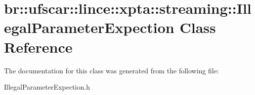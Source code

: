\hypertarget{classbr_1_1ufscar_1_1lince_1_1xpta_1_1streaming_1_1IllegalParameterExpection}{
\section{br::ufscar::lince::xpta::streaming::IllegalParameterExpection Class Reference}
\label{classbr_1_1ufscar_1_1lince_1_1xpta_1_1streaming_1_1IllegalParameterExpection}
}


The documentation for this class was generated from the following file:\begin{DoxyCompactItemize}
\item 
IllegalParameterExpection.h\end{DoxyCompactItemize}
